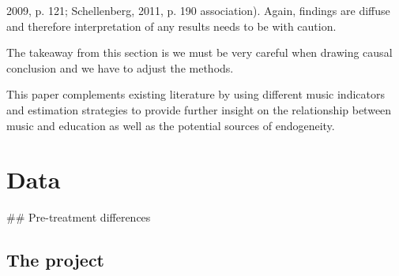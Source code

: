 \documentclass[a4, 12pt]{article}
\begin{document}
2009, p. 121; Schellenberg, 2011, p. 190 association). Again, findings are diffuse and therefore interpretation of any results needs to be with caution.

The takeaway from this section is we must be very careful when drawing causal conclusion and we have to adjust the methods.

This paper complements existing literature by using different music indicators and estimation strategies to provide further insight on the relationship between music and education as well as the potential sources of endogeneity.

\clearpage

\hypertarget{data}{%
\section{Data}\label{data}}

\label{ch:data}
\#\# Pre-treatment differences

\hypertarget{the-project}{%
\subsection{The project}\label{the-project}}
\end{document}
